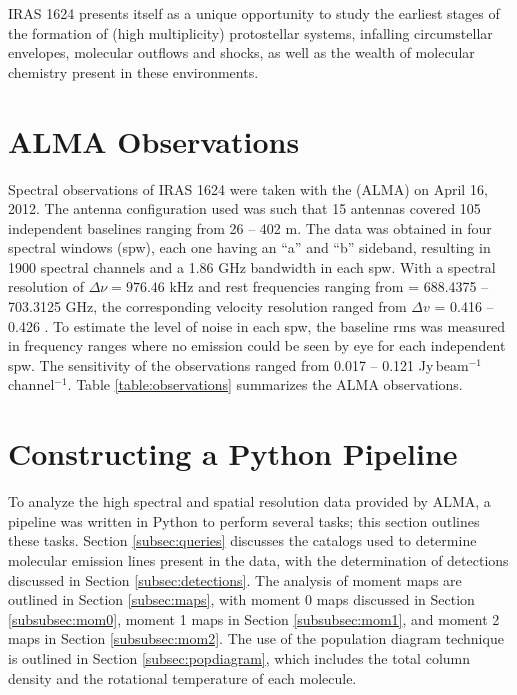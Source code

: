\documentclass[iop,twocolappendix]{emulateapj}
\begin{document}
IRAS 1624 presents itself as a unique opportunity to study the earliest stages of the formation of (high multiplicity) protostellar systems, infalling circumstellar envelopes, molecular outflows and shocks, as well as the wealth of molecular chemistry present in these environments.

\section{ALMA Observations}
\label{sec:observations}

Spectral observations of IRAS 1624 were taken with the {\ALMA} (ALMA) on April 16, 2012. The antenna configuration used was such that 15 antennas covered 105 independent baselines ranging from 26 -- 402 m. The data was obtained in four spectral windows (spw), each one having an ``a'' and ``b'' sideband, resulting in 1900 spectral channels and a 1.86 GHz bandwidth in each spw. With a spectral resolution of ${\Delta}{\nu} = 976.46$ kHz and rest frequencies ranging from {\restfreq} = 688.4375 -- 703.3125 GHz, the corresponding velocity resolution ranged from ${\Delta}v$ = 0.416 -- 0.426 \kms. To estimate the level of noise in each spw, the baseline rms was measured in frequency ranges where no emission could be seen by eye for each independent spw. The sensitivity of the observations ranged from 0.017 -- 0.121 Jy\,beam$^{-1}$\,channel$^{-1}$. Table \ref{table:observations} summarizes the ALMA observations. 

\section{Constructing a Python Pipeline}
\label{sec:pipeline}

To analyze the high spectral and spatial resolution data provided by ALMA, a pipeline was written in Python to perform several tasks; this section outlines these tasks. Section \ref{subsec:queries} discusses the catalogs used to determine molecular emission lines present in the data, with the determination of detections discussed in Section \ref{subsec:detections}. The analysis of moment maps are outlined in Section \ref{subsec:maps}, with moment 0 maps discussed in Section \ref{subsubsec:mom0}, moment 1 maps in Section \ref{subsubsec:mom1}, and moment 2 maps in Section \ref{subsubsec:mom2}. The use of the population diagram technique is outlined in Section \ref{subsec:popdiagram}, which includes the total column density and the rotational temperature of each molecule. 
\end{document}
